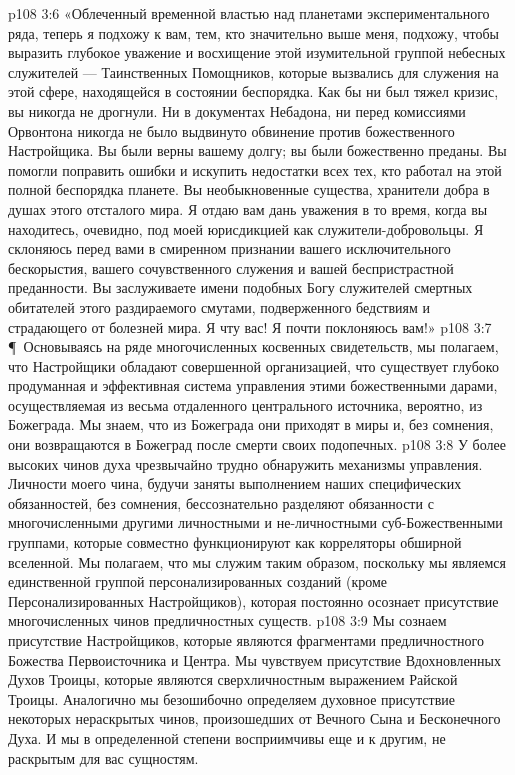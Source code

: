 \vs p108 3:6 «Облеченный временной властью над планетами экспериментального ряда, теперь я подхожу к вам, тем, кто значительно выше меня, подхожу, чтобы выразить глубокое уважение и восхищение этой изумительной группой небесных служителей --- Таинственных Помощников, которые вызвались для служения на этой сфере, находящейся в состоянии беспорядка. Как бы ни был тяжел кризис, вы никогда не дрогнули. Ни в документах Небадона, ни перед комиссиями Орвонтона никогда не было выдвинуто обвинение против божественного Настройщика. Вы были верны вашему долгу; вы были божественно преданы. Вы помогли поправить ошибки и искупить недостатки всех тех, кто работал на этой полной беспорядка планете. Вы необыкновенные существа, хранители добра в душах этого отсталого мира. Я отдаю вам дань уважения в то время, когда вы находитесь, очевидно, под моей юрисдикцией как служители\hyp{}добровольцы. Я склоняюсь перед вами в смиренном признании вашего исключительного бескорыстия, вашего сочувственного служения и вашей беспристрастной преданности. Вы заслуживаете имени подобных Богу служителей смертных обитателей этого раздираемого смутами, подверженного бедствиям и страдающего от болезней мира. Я чту вас! Я почти поклоняюсь вам!»
\vs p108 3:7 \P\ Основываясь на ряде многочисленных косвенных свидетельств, мы полагаем, что Настройщики обладают совершенной организацией, что существует глубоко продуманная и эффективная система управления этими божественными дарами, осуществляемая из весьма отдаленного центрального источника, вероятно, из Божеграда. Мы знаем, что из Божеграда они приходят в миры и, без сомнения, они возвращаются в Божеград после смерти своих подопечных.
\vs p108 3:8 У более высоких чинов духа чрезвычайно трудно обнаружить механизмы управления. Личности моего чина, будучи заняты выполнением наших специфических обязанностей, без сомнения, бессознательно разделяют обязанности с многочисленными другими личностными и не\hyp{}личностными суб\hyp{}Божественными группами, которые совместно функционируют как корреляторы обширной вселенной. Мы полагаем, что мы служим таким образом, поскольку мы являемся единственной группой персонализированных созданий (кроме Персонализированных Настройщиков), которая постоянно осознает присутствие многочисленных чинов предличностных существ.
\vs p108 3:9 Мы сознаем присутствие Настройщиков, которые являются фрагментами предличностного Божества Первоисточника и Центра. Мы чувствуем присутствие Вдохновленных Духов Троицы, которые являются сверхличностным выражением Райской Троицы. Аналогично мы безошибочно определяем духовное присутствие некоторых нераскрытых чинов, произошедших от Вечного Сына и Бесконечного Духа. И мы в определенной степени восприимчивы еще и к другим, не раскрытым для вас сущностям.

